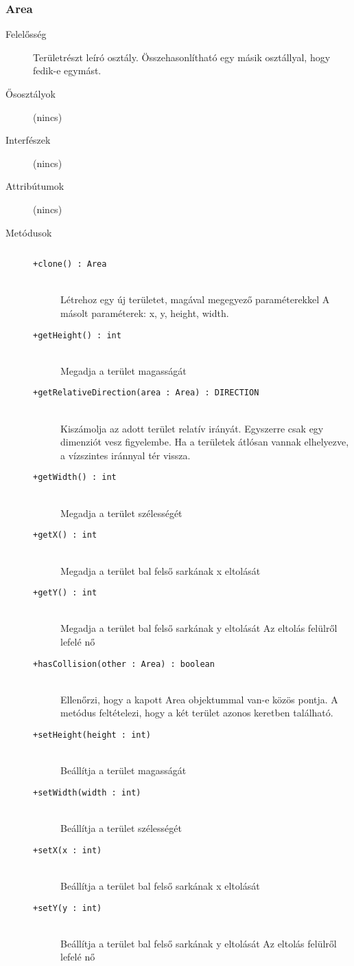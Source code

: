 		\subsubsection{Area}
			\begin{description}

				\item[Felelősség] Területrészt leíró osztály. Összehasonlítható egy másik osztállyal, hogy fedik-e egymást.

				\item[Ősosztályok] (nincs)
				\item[Interfészek] (nincs)
				\item[Attribútumok] (nincs)
				\item[Metódusok]$\ $
					\begin{description}
						\item[\texttt{+clone() : Area}] \hfill \\Létrehoz egy új területet, magával megegyező paraméterekkel    A másolt paraméterek: x, y, height, width. 
						\item[\texttt{+getHeight() : int}] \hfill \\Megadja a terület magasságát 
						\item[\texttt{+getRelativeDirection(area : Area) : DIRECTION}] \hfill \\ Kiszámolja az adott terület relatív irányát. Egyszerre csak egy dimenziót vesz figyelembe. Ha a területek átlósan vannak elhelyezve, a vízszintes iránnyal tér vissza.
						\item[\texttt{+getWidth() : int}] \hfill \\Megadja a terület szélességét 
						\item[\texttt{+getX() : int}] \hfill \\Megadja a terület bal felső sarkának x eltolását 
						\item[\texttt{+getY() : int}] \hfill \\Megadja a terület bal felső sarkának y eltolását    Az eltolás felülről lefelé nő 
						\item[\texttt{+hasCollision(other : Area) : boolean}] \hfill \\Ellenőrzi, hogy a kapott Area objektummal van-e közös pontja.  A metódus feltételezi, hogy a két terület azonos keretben található. 
						\item[\texttt{+setHeight(height : int)}] \hfill \\Beállítja a terület magasságát 
						\item[\texttt{+setWidth(width : int)}] \hfill \\Beállítja a terület szélességét 
						\item[\texttt{+setX(x : int)}] \hfill \\Beállítja a terület bal felső sarkának x eltolását 
						\item[\texttt{+setY(y : int)}] \hfill \\Beállítja a terület bal felső sarkának y eltolását    Az eltolás felülről lefelé nő 
					\end{description}
			\end{description}

